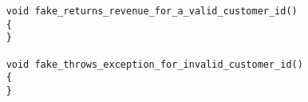 \begin{verbatim}
    void fake_returns_revenue_for_a_valid_customer_id()
    {
    }
    
    void fake_throws_exception_for_invalid_customer_id()
    {
    }
\end{verbatim}